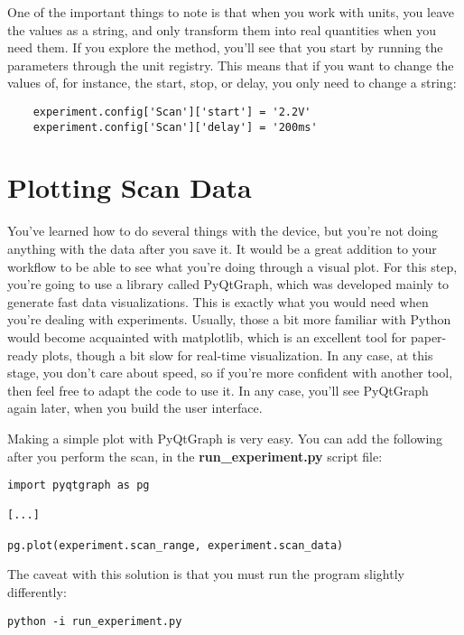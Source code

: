 One of the important things to note is that when you work with units, you leave the values as a string, and only transform them into real quantities when you need them. If you explore the  method, you'll see that you start by running the parameters through the unit registry. This means that if you want to change the values of, for instance, the start, stop, or delay, you only need to change a string:

\begin{verbatim}
    experiment.config['Scan']['start'] = '2.2V'
    experiment.config['Scan']['delay'] = '200ms'
\end{verbatim}

\section{Plotting Scan Data}\label{sec:basic-plotting}
You've learned how to do several things with the device, but you're not doing anything with the data after you save it. It would be a great addition to your workflow to be able to see what you're doing through a visual plot. For this step, you're going to use a library called PyQtGraph, which was developed mainly to generate fast data visualizations. This is exactly what you would need when you're dealing with experiments. Usually, those a bit more familiar with Python would become acquainted with matplotlib, which is an excellent tool for paper-ready plots, though a bit slow for real-time visualization. In any case, at this stage, you don't care about speed, so if you're more confident with another tool, then feel free to adapt the code to use it. In any case, you'll see PyQtGraph again later, when you build the user interface.

Making a simple plot with PyQtGraph is very easy. You can add the following after you perform the scan, in the \textbf{run\_experiment.py} script file:

\begin{verbatim}
import pyqtgraph as pg

[...]

pg.plot(experiment.scan_range, experiment.scan_data)
\end{verbatim}

The caveat with this solution is that you must run the program slightly differently:

\begin{verbatim}
python -i run_experiment.py
\end{verbatim}

